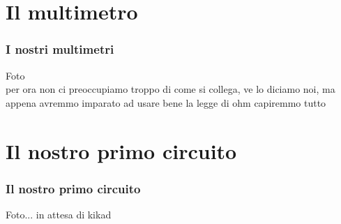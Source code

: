 	\section{Il multimetro} %
	\label{sec:il_multimetro}
		\begin{frame}[c]\frametitle{I nostri multimetri}
		    
			Foto\\

			per ora non ci preoccupiamo troppo di come si collega, ve lo diciamo noi, ma appena avremmo imparato ad usare bene la legge di ohm capiremmo tutto		
		\end{frame}

	\section{Il nostro primo circuito} %
	\label{sec:il_nostro_primo_circuito}

		\begin{frame}[c]\frametitle{Il nostro primo circuito}
			    
					Foto... in attesa di kikad
		
		\end{frame}	
